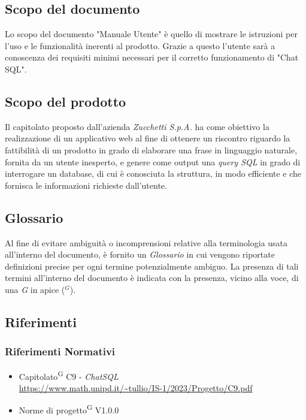 \documentclass[5pt]{article}
\begin{document}
		\subsection{Scopo del documento}
			Lo scopo del documento "Manuale Utente" è quello di mostrare le istruzioni per l'uso e le funzionalità inerenti al prodotto. Grazie a questo l'utente sarà a conoscenza dei requisiti minimi necessari per il corretto funzionamento di "Chat SQL".

		\subsection{Scopo del prodotto}
			Il capitolato proposto dall'azienda \textit{Zucchetti S.p.A.} ha come obiettivo la realizzazione di un applicativo web al fine di ottenere un riscontro riguardo la fattibilità di un prodotto in grado di elaborare una frase in linguaggio naturale, fornita da un utente inesperto, e genere come output una \textit{query SQL} in grado di interrogare un database, di cui è conosciuta la struttura, in modo efficiente e che fornisca le informazioni richieste dall'utente.

        \subsection{Glossario}
     		Al fine di evitare ambiguità o incomprensioni relative alla terminologia usata all'interno del documento, è fornito un \textit{Glossario} in cui vengono riportate definizioni precise per ogni termine potenzialmente ambiguo. La presenza di tali termini all'interno del documento è indicata con la presenza, vicino alla voce, di una \textit{G} in apice ($^G$). 

        \subsection{Riferimenti}
        
			\subsubsection{Riferimenti Normativi}
			\begin{itemize}
				\item Capitolato\textsuperscript{G} C9 - \textit{ChatSQL} \\ \url{https://www.math.unipd.it/~tullio/IS-1/2023/Progetto/C9.pdf} 
				\item Norme di progetto\textsuperscript{G} V1.0.0
			\end{itemize}
			
\end{document}
